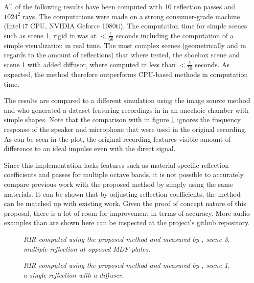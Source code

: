 \documentclass[twoside,a4paper]{article}
\begin{document}
All of the following results have been computed with 10 reflection passes and $1024^2$ rays. The computations were made on a strong consumer-grade machine (Intel i7 CPU, NVIDIA Geforce 1080ti). The computation time for simple scenes such as scene 1, rigid in \cite{brinkmann_round_2019} was at $<\frac{1}{60}$ seconds including the computation of a simple visualization in real time. The most complex scenes (geometrically and in regards to the amount of reflections) that where tested, the shoebox scene and scene 1 with added diffusor, where computed in less than $<\frac{1}{50}$ seconds. As expected, the method therefore outperforms CPU-based methods in computation time.  \

The results are compared to a different simulation using the image source method \cite{lehmann_fast_2020} and \cite{brinkmann_round_2019} who generated a dataset featuring recordings in in an anechoic chamber with simple shapes. Note that the comparison with \cite{brinkmann_round_2019} in figure \ref{fig:multRefl} ignores the frequency response of the speaker and microphone that were used in the original recording. As can be seen in the plot, the original recording features visible amount of difference to an ideal impulse even with the direct signal. 

Since this implementation lacks features such as material-specific reflection coefficients and passes for multiple octave bands, it is not possible to accurately compare previous work with the proposed method by simply using the same materials. It can be shown that by adjusting reflection coefficients, the method can be matched up with existing work.
Given the proof of concept nature of this proposal, there is a lot of room for improvement in terms of accuracy. More audio examples than are shown here can be inspected at the project's github repository.
\begin{figure}

    \begin{center}
      
    \end{center}
    
    \caption{\label{fig:multRefl} \it RIR computed using the proposed method and measured by \cite{brinkmann_round_2019}, scene 3, multiple reflection at opposed MDF plates.}
\end{figure}

\begin{figure}
    \begin{center}
      
    \end{center}
    
    \caption{\label{fig:diffuser} \it RIR computed using the proposed method and measured by \cite{brinkmann_round_2019}, scene 1, a single reflection with a diffuser.}
\end{figure}
\end{document}
